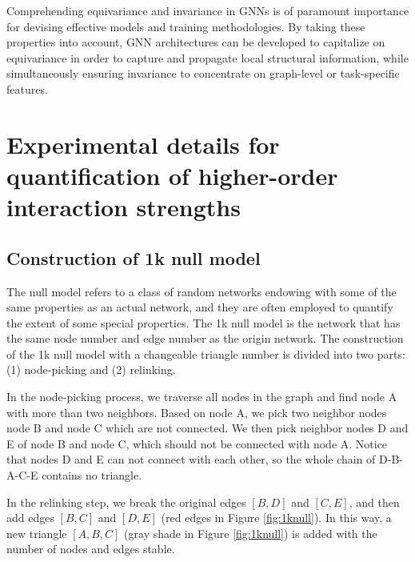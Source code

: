 \documentclass[letterpaper]{article} \usepackage{aaai24}
\theoremstyle{plain}
\theoremstyle{definition}
\theoremstyle{remark}
\begin{document}
Comprehending equivariance and invariance in GNNs is of paramount importance for devising effective models and training methodologies. By taking these properties into account, GNN architectures can be developed to capitalize on equivariance in order to capture and propagate local structural information, while simultaneously ensuring invariance to concentrate on graph-level or task-specific features.










\section{Experimental details for quantification of higher-order interaction strengths}
\label{appendix:S_p}











\subsection{Construction of 1k null model}
\label{appendix:1k}


The null model \cite{nullmodel} refers to a class of random networks endowing with some of the same properties as an actual network, and they are often employed to quantify the extent of some special properties.
The 1k null model \cite{YRM2023} is the network that has the same node number and edge number as the origin network.
The construction of the 1k null model with a changeable triangle number is divided into two parts: (1) node-picking and (2) relinking. 

In the node-picking process, we traverse all nodes in the graph and find node A with more than two neighbors. 
Based on node A, we pick two neighbor nodes node B and node C which are not connected.
We then pick neighbor nodes D and E of node B and node C, which should not be connected with node A. 
Notice that nodes D and E can not connect with each other, so the whole chain of D-B-A-C-E contains no triangle.

In the relinking step, we break the original edges $[B, D]$ and $[C, E]$, and then add edges $[B, C]$ and $[D, E]$ (red edges in Figure \ref{fig:1knull}). 
In this way, a new triangle $[A, B, C]$ (gray shade in  Figure \ref{fig:1knull}) is added with the number of nodes and edges stable.
\end{document}
